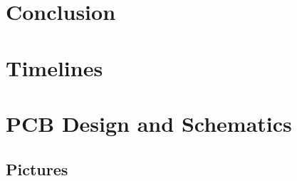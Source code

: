\documentclass[11pt,letterpaper]{article}
\begin{document}
\section{Conclusion}
\label{sec:conclusion}

\clearpage

{}

\clearpage

\appendix
\section{Timelines}
\label{sec:appendix-timelines}

\clearpage

\section{PCB Design and Schematics}
\label{sec:appendix-schematics}

\clearpage

\begin{landscape}
\section{Pictures}
\label{sec:appendix-pictures}

\end{landscape}
\clearpage

%
%
\end{document}
